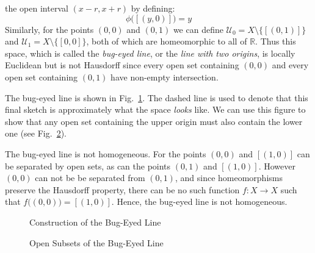 \documentclass{article}                                                        %
\begin{document}
\begin{example}
                the open interval $(x-r,x+r)$ by defining:
                \begin{equation}
                    \phi\big([(y,0)]\big)=y
                \end{equation}
                Similarly, for the points $(0,0)$ and $(0,1)$ we can define
                $\mathcal{U}_{0}=X\setminus\{[(0,1)]\}$ and
                $\mathcal{U}_{1}=X\setminus\{[0,0]\}$, both of which are
                homeomorphic to all of $\mathbb{R}$. Thus this space, which is
                called the \textit{bug-eyed line}, or the
                \textit{line with two origins}, is
                locally Euclidean but is not Hausdorff since every open set
                containing $(0,0)$ and every open set containing $(0,1)$ have
                non-empty intersection.
        \end{example}
        The bug-eyed line is shown in
        Fig.~\ref{fig:Bug_Eyed_Line}. The dashed line is used to denote that
        this final sketch is approximately what the space \textit{looks}
        like. We can use this figure to show that any open set containing
        the upper origin must also contain the lower one
        (see Fig.~\ref{fig:Open_Neighborhoods_of_Origins_in_Bug_Eyed_Line}).
        \begin{example}
                The bug-eyed line is not homogeneous. For the points $(0,0)$ and
                $[(1,0)]$ can be separated by open sets, as can the points
                $(0,1)$ and $[(1,0)]$. However $(0,0)$ can not be be separated
                from $(0,1)$, and since homeomorphisms preserve the Hausdorff
                property, there can be no such function $f:X\rightarrow{X}$ such
                that $f\big((0,0)\big)=[(1,0)]$. Hence, the bug-eyed line is
                not homogeneous.
        \end{example}
        \begin{figure}[H]
                \centering
                \captionsetup{type=figure}
                
                \caption{Construction of the Bug-Eyed Line}
                \label{fig:Bug_Eyed_Line}
        \end{figure}
        \begin{figure}[H]
                \centering
                \captionsetup{type=figure}
                
                \caption{Open Subsets of the Bug-Eyed Line}
                \label{fig:Open_Neighborhoods_of_Origins_in_Bug_Eyed_Line}
        \end{figure}
\end{document}
